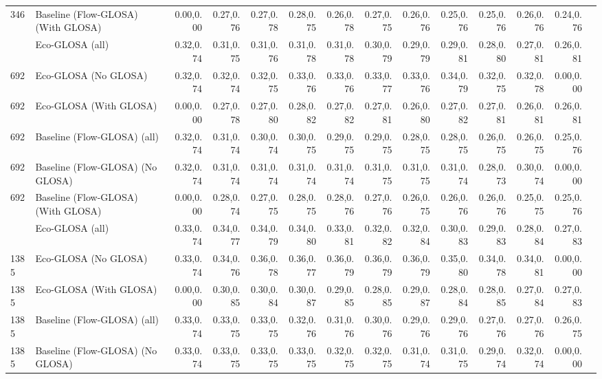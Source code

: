 \begin{table}[ht]
{\begin{tabular}{llrrrrrrrrrrrr}
        346  & Baseline (Flow-GLOSA) (With GLOSA) & 0.00,0.00 & 0.27,0.76 & 0.27,0.78 & 0.28,0.75 & 0.26,0.78 & 0.27,0.75 & 0.26,0.76 & 0.25,0.76 & 0.25,0.76 & 0.26,0.76 & 0.24,0.76 \\
        \addlinespace
        692  & Eco-GLOSA (all)                    & 0.32,0.74 & 0.31,0.75 & 0.31,0.76 & 0.31,0.78 & 0.31,0.78 & 0.30,0.79 & 0.29,0.79 & 0.29,0.81 & 0.28,0.80 & 0.27,0.81 & 0.26,0.81 \\
        692  & Eco-GLOSA (No GLOSA)               & 0.32,0.74 & 0.32,0.74 & 0.32,0.75 & 0.33,0.76 & 0.33,0.76 & 0.33,0.77 & 0.33,0.76 & 0.34,0.79 & 0.32,0.75 & 0.32,0.78 & 0.00,0.00 \\
        692  & Eco-GLOSA (With GLOSA)             & 0.00,0.00 & 0.27,0.78 & 0.27,0.80 & 0.28,0.82 & 0.27,0.82 & 0.27,0.81 & 0.26,0.80 & 0.27,0.82 & 0.27,0.81 & 0.26,0.81 & 0.26,0.81 \\
        692  & Baseline (Flow-GLOSA) (all)        & 0.32,0.74 & 0.31,0.74 & 0.30,0.74 & 0.30,0.75 & 0.29,0.75 & 0.29,0.75 & 0.28,0.75 & 0.28,0.75 & 0.26,0.75 & 0.26,0.75 & 0.25,0.76 \\
        692  & Baseline (Flow-GLOSA) (No GLOSA)   & 0.32,0.74 & 0.31,0.74 & 0.31,0.74 & 0.31,0.74 & 0.31,0.74 & 0.31,0.75 & 0.31,0.75 & 0.31,0.74 & 0.28,0.73 & 0.30,0.74 & 0.00,0.00 \\
        692  & Baseline (Flow-GLOSA) (With GLOSA) & 0.00,0.00 & 0.28,0.74 & 0.27,0.75 & 0.28,0.75 & 0.28,0.76 & 0.27,0.76 & 0.26,0.75 & 0.26,0.76 & 0.26,0.76 & 0.25,0.75 & 0.25,0.76 \\
        \addlinespace
        1385 & Eco-GLOSA (all)                    & 0.33,0.74 & 0.34,0.77 & 0.34,0.79 & 0.34,0.80 & 0.33,0.81 & 0.32,0.82 & 0.32,0.84 & 0.30,0.83 & 0.29,0.83 & 0.28,0.84 & 0.27,0.83 \\
        1385 & Eco-GLOSA (No GLOSA)               & 0.33,0.74 & 0.34,0.76 & 0.36,0.78 & 0.36,0.77 & 0.36,0.79 & 0.36,0.79 & 0.36,0.79 & 0.35,0.80 & 0.34,0.78 & 0.34,0.81 & 0.00,0.00 \\
        1385 & Eco-GLOSA (With GLOSA)             & 0.00,0.00 & 0.30,0.85 & 0.30,0.84 & 0.30,0.87 & 0.29,0.85 & 0.28,0.85 & 0.29,0.87 & 0.28,0.84 & 0.28,0.85 & 0.27,0.84 & 0.27,0.83 \\
        1385 & Baseline (Flow-GLOSA) (all)        & 0.33,0.74 & 0.33,0.75 & 0.33,0.75 & 0.32,0.76 & 0.31,0.76 & 0.30,0.76 & 0.29,0.76 & 0.29,0.76 & 0.27,0.76 & 0.27,0.76 & 0.26,0.75 \\
        1385 & Baseline (Flow-GLOSA) (No GLOSA)   & 0.33,0.74 & 0.33,0.75 & 0.33,0.75 & 0.33,0.75 & 0.32,0.75 & 0.32,0.75 & 0.31,0.74 & 0.31,0.75 & 0.29,0.74 & 0.32,0.74 & 0.00,0.00 \\

\end{tabular}}
\end{table}
